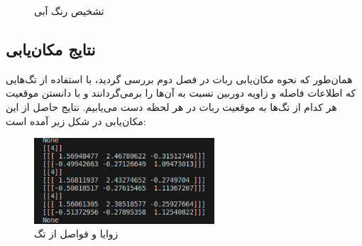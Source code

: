 \begin{figure}[h]
	\centering
	\qquad
	\caption{تشخیص رنگ آبی}
	\label{تشخیص رنگ آبی}
\end{figure}
\noindent
\unskip
\subsection{نتایج مکان‌یابی}
\label{نتایج مکان‌یابی}
همان‌طور که نحوه مکان‌یابی ربات در فصل دوم بررسی گردید، با استفاده از تگ‌‌هایی که اطلاعات فاصله و زاویه دوربین نسبت به آن‌‌ها را برمی‌گردانند و با دانستن موقعیت هر کدام از تگ‌ها به موقعیت ربات در هر لحظه دست می‌یابیم. نتایج حاصل از این مکان‌یابی در شکل زیر آمده است:
\begin{figure}[h]
	\centering
	\includegraphics[width=0.6\textwidth]{./images/Chapter5/arucoMatrices}	
	\caption[ زوایا و فواصل از تگ]{زوایا و فواصل از تگ}
	\label{مکان‌یابی}
\end{figure}
\noindent
\unskip

